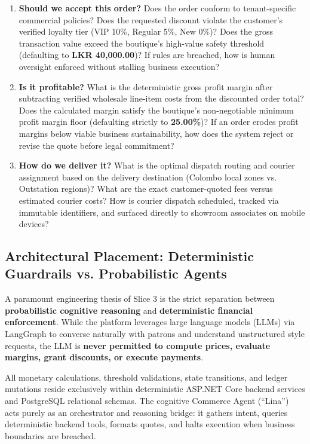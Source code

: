 \begin{enumerate}
    \item \textbf{Should we accept this order?} Does the order conform to tenant-specific commercial policies? Does the requested discount violate the customer's verified loyalty tier (VIP 10\%, Regular 5\%, New 0\%)? Does the gross transaction value exceed the boutique's high-value safety threshold (defaulting to \textbf{LKR 40,000.00})? If rules are breached, how is human oversight enforced without stalling business execution?
    \item \textbf{Is it profitable?} What is the deterministic gross profit margin after subtracting verified wholesale line-item costs from the discounted order total? Does the calculated margin satisfy the boutique's non-negotiable minimum profit margin floor (defaulting strictly to \textbf{25.00\%})? If an order erodes profit margins below viable business sustainability, how does the system reject or revise the quote before legal commitment?
    \item \textbf{How do we deliver it?} What is the optimal dispatch routing and courier assignment based on the delivery destination (Colombo local zones vs. Outstation regions)? What are the exact customer-quoted fees versus estimated courier costs? How is courier dispatch scheduled, tracked via immutable identifiers, and surfaced directly to showroom associates on mobile devices?
\end{enumerate}

\subsection{Architectural Placement: Deterministic Guardrails vs. Probabilistic Agents}

A paramount engineering thesis of Slice 3 is the strict separation between \textbf{probabilistic cognitive reasoning} and \textbf{deterministic financial enforcement}. While the platform leverages large language models (LLMs) via LangGraph to converse naturally with patrons and understand unstructured style requests, the LLM is \textbf{never permitted to compute prices, evaluate margins, grant discounts, or execute payments}. 

All monetary calculations, threshold validations, state transitions, and ledger mutations reside exclusively within deterministic ASP.NET Core backend services and PostgreSQL relational schemas. The cognitive Commerce Agent (``Lina'') acts purely as an orchestrator and reasoning bridge: it gathers intent, queries deterministic backend tools, formats quotes, and halts execution when business boundaries are breached.

